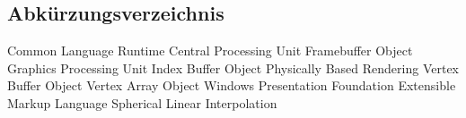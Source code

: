 \begin{acronym}
	\chapter*{Abkürzungsverzeichnis}
	 {Common Language Runtime}
	 {Central Processing Unit}
	 {Framebuffer Object}
	 {Graphics Processing Unit}
	 {Index Buffer Object}
	 {Physically Based Rendering}
	 {Vertex Buffer Object}
	 {Vertex Array Object}
		{Windows Presentation Foundation}
	 {Extensible Markup Language}
	 {Spherical Linear Interpolation}
\end{acronym}